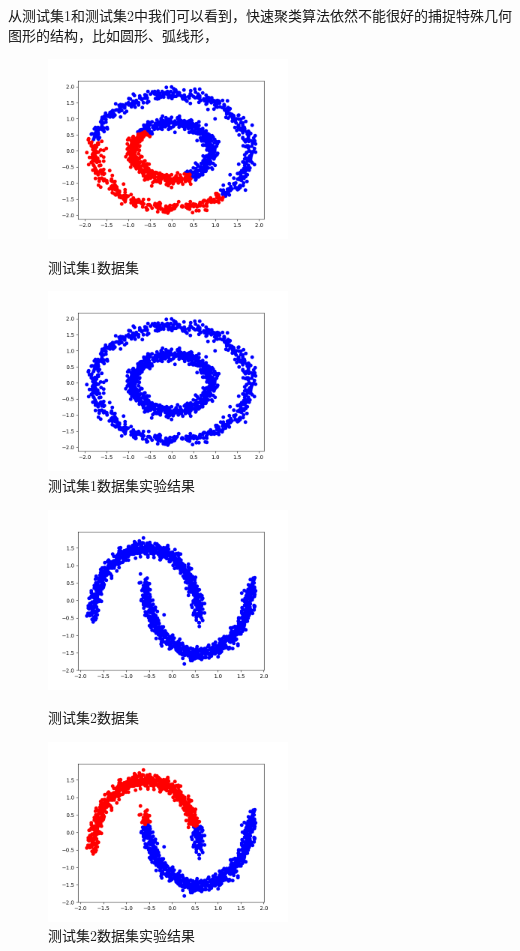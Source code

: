 \documentclass{article}
\begin{document}
    从测试集1和测试集2中我们可以看到，快速聚类算法依然不能很好的捕捉特殊几何图形的结构，比如圆形、弧线形，
   \begin{figure}[!ht]
\centering
    \begin{minipage}[c]{0.5\textwidth}
        \centering
      \includegraphics[width=2.5in]{ds1}
      \caption{测试集1数据集}\label{aa}
    \end{minipage}%
    \begin{minipage}[c]{0.5\textwidth}
        \centering
      \includegraphics[width=2.5in]{ds12}
      \caption{测试集1数据集实验结果}\label{aa}
    \end{minipage}
\end{figure}


   \begin{figure}[!ht]
\centering
    \begin{minipage}[c]{0.5\textwidth}
        \centering
      \includegraphics[width=2.5in]{ds2}
      \caption{测试集2数据集}\label{aa}
    \end{minipage}%
    \begin{minipage}[c]{0.5\textwidth}
        \centering
      \includegraphics[width=2.5in]{ds22}
      \caption{测试集2数据集实验结果}\label{aa}
    \end{minipage}
\end{figure}
\end{document}
